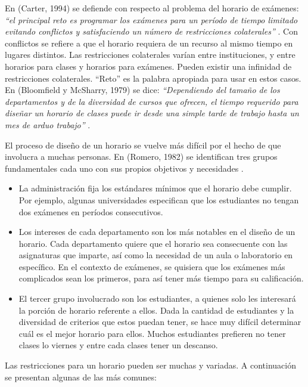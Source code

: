 En (Carter, 1994) se defiende con respecto al problema del horario de exámenes: \emph{``el principal reto es programar los exámenes para un período de tiempo limitado evitando conflictos y satisfaciendo un número de restricciones
colaterales''} \cite{Carter's summary}. Con conflictos se refiere a que el horario requiera de un recurso
al mismo tiempo en lugares distintos. Las restricciones colaterales var\'ian entre instituciones, y entre
horarios para clases y horarios para exámenes. Pueden existir una infinidad de restricciones colaterales.
``Reto'' es la palabra apropiada para usar en estos casos.
En (Bloomfield y McSharry, 1979) se dice: \emph{``Dependiendo del tamaño de los departamentos y de la diversidad
de cursos que ofrecen, el tiempo requerido para diseñar un horario de clases puede ir desde una simple
tarde de trabajo hasta un mes de arduo trabajo''} \cite{Bloomfield and McSharry says}.

El proceso de diseño de un horario se vuelve más difícil por el hecho de que involucra a muchas personas.
En (Romero, 1982) se identifican tres grupos fundamentales cada uno con sus propios objetivos y necesidades \cite{Romero}.

\begin{itemize}
	\item La administración fija los estándares  mínimos que el horario debe cumplir. Por ejemplo, algunas
		universidades especifican que los estudiantes no tengan dos exámenes en períodos consecutivos.
	\item Los intereses de cada departamento son los más notables en el diseño de un horario. Cada departamento
		quiere que el horario sea consecuente con las asignaturas que imparte, as\'i como la necesidad de un
		aula o laboratorio en específico. En el contexto de exámenes, se quisiera que los exámenes más complicados
		sean los primeros, para as\'i tener más tiempo para su calificación.
	\item El tercer grupo involucrado son los estudiantes, a quienes solo les interesará la porción de horario
		referente a ellos. Dada la cantidad de estudiantes y la diversidad de criterios que estos puedan tener,
		se hace muy difícil determinar cu\'al es el mejor horario para ellos. Muchos estudiantes prefieren no
		tener clases lo viernes y entre cada clases tener un descanso.		
\end{itemize}

Las restricciones para un horario pueden ser muchas y variadas. A continuación se presentan algunas de 
las más comunes:

